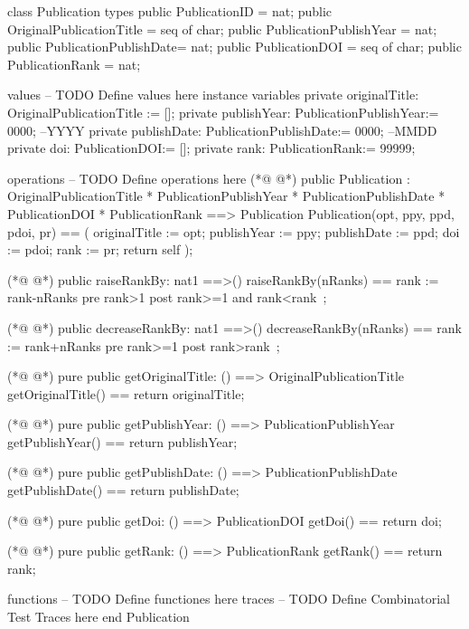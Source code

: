 \begin{vdmpp}[breaklines=true]
class Publication
types
public PublicationID = nat;
public OriginalPublicationTitle = seq of char;
public PublicationPublishYear = nat;
public PublicationPublishDate=  nat;
public PublicationDOI = seq of char;
public PublicationRank = nat;


values
-- TODO Define values here
instance variables
private originalTitle: OriginalPublicationTitle := [];
private publishYear: PublicationPublishYear:= 0000; --YYYY
private publishDate: PublicationPublishDate:= 0000; --MMDD
private doi: PublicationDOI:= [];
private rank: PublicationRank:= 99999;

operations
-- TODO Define operations here
(*@
\label{Publication:22}
@*)
public Publication :  OriginalPublicationTitle * 
           PublicationPublishYear * PublicationPublishDate *
           PublicationDOI * PublicationRank ==> Publication
 Publication(opt, ppy, ppd, pdoi, pr) == (
  originalTitle := opt;
  publishYear := ppy;
  publishDate := ppd;
  doi := pdoi;
  rank := pr;
  return self
 );
 
(*@
\label{raiseRankBy:34}
@*)
 public raiseRankBy: nat1 ==>()
 raiseRankBy(nRanks) == rank := rank-nRanks
 pre rank>1 
 post rank>=1 and rank<rank~;
 
(*@
\label{decreaseRankBy:39}
@*)
 public decreaseRankBy: nat1 ==>()
 decreaseRankBy(nRanks) == rank := rank+nRanks
 pre rank>=1
 post rank>rank~;
 
(*@
\label{getOriginalTitle:44}
@*)
 pure public getOriginalTitle: () ==> OriginalPublicationTitle
  getOriginalTitle() == return originalTitle;
 
(*@
\label{getPublishYear:47}
@*)
 pure public getPublishYear: () ==> PublicationPublishYear
 getPublishYear() == return publishYear;
 
(*@
\label{getPublishDate:50}
@*)
 pure public getPublishDate: () ==> PublicationPublishDate
 getPublishDate() == return publishDate;
 
(*@
\label{getDoi:53}
@*)
 pure public getDoi: () ==> PublicationDOI
 getDoi() == return doi;
 
(*@
\label{getRank:56}
@*)
 pure public getRank: () ==> PublicationRank
 getRank() == return rank;

functions
-- TODO Define functiones here
traces
-- TODO Define Combinatorial Test Traces here
end Publication
\end{vdmpp}
